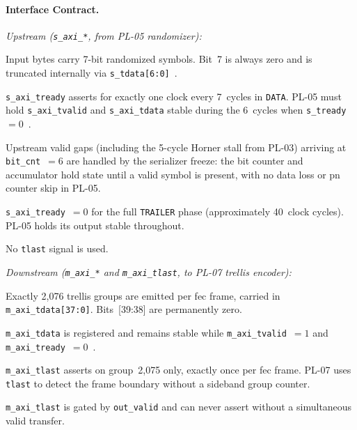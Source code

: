 \FloatBarrier


\paragraph{Interface Contract.}

\textit{Upstream (\texttt{s\_axi\_*}, from PL-05 randomizer):}
\begin{tightemize}
  \item Input bytes carry 7-bit randomized symbols. Bit~7 is always zero
        and is truncated internally via
        \texttt{s\_tdata[6:0]}~\cite{ITU_J83}.
  \item \texttt{s\_axi\_tready} asserts for exactly one clock every
        7~cycles in \texttt{DATA}. PL-05 must hold \texttt{s\_axi\_tvalid}
        and \texttt{s\_axi\_tdata} stable during the 6~cycles when
        \texttt{s\_tready}~$= 0$~\cite{ARM_IHI0022}.
  \item Upstream valid gaps (including the 5-cycle Horner stall from
        PL-03) arriving at \texttt{bit\_cnt}~$= 6$ are handled by the
        serializer freeze: the bit counter and accumulator hold state
        until a valid symbol is present, with no data loss or
        \ac{pn} counter skip in PL-05.
  \item \texttt{s\_axi\_tready}~$= 0$ for the full \texttt{TRAILER} phase
        (approximately 40~clock cycles). PL-05 holds its output stable
        throughout.
  \item No \texttt{tlast} signal is used.
\end{tightemize}

\textit{Downstream (\texttt{m\_axi\_*} and \texttt{m\_axi\_tlast}, to
PL-07 trellis encoder):}
\begin{tightemize}
  \item Exactly 2{,}076 trellis groups are emitted per \ac{fec} frame,
        carried in \texttt{m\_axi\_tdata[37:0]}. Bits~[39:38] are
        permanently zero.
  \item \texttt{m\_axi\_tdata} is registered and remains stable while
        \texttt{m\_axi\_tvalid}~$= 1$ and
        \texttt{m\_axi\_tready}~$= 0$~\cite{ARM_IHI0022}.
  \item \texttt{m\_axi\_tlast} asserts on group~2{,}075 only, exactly once
        per \ac{fec} frame. PL-07 uses \texttt{tlast} to detect the frame
        boundary without a sideband group counter.
  \item \texttt{m\_axi\_tlast} is gated by \texttt{out\_valid} and can
        never assert without a simultaneous valid transfer.
\end{tightemize}

